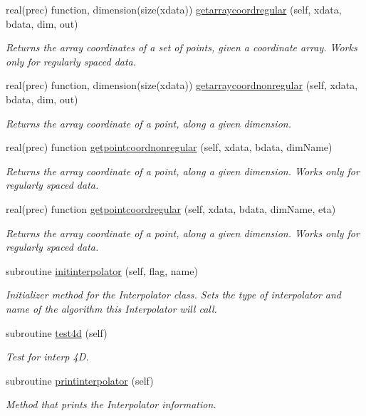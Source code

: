 \begin{DoxyCompactItemize}
real(prec) function, dimension(size(xdata)) \mbox{\hyperlink{namespaceinterpolator__mod_a754f0cf5a885cf5f42a78728bb50c935}{getarraycoordregular}} (self, xdata, bdata, dim, out)
\begin{DoxyCompactList}\small\item\em Returns the array coordinates of a set of points, given a coordinate array. Works only for regularly spaced data. \end{DoxyCompactList}\item 
real(prec) function, dimension(size(xdata)) \mbox{\hyperlink{namespaceinterpolator__mod_a559aea65a39f0e640874f388af7a259d}{getarraycoordnonregular}} (self, xdata, bdata, dim, out)
\begin{DoxyCompactList}\small\item\em Returns the array coordinate of a point, along a given dimension. \end{DoxyCompactList}\item 
real(prec) function \mbox{\hyperlink{namespaceinterpolator__mod_a42030e713960b5bf88d00a76a7ed0a72}{getpointcoordnonregular}} (self, xdata, bdata, dim\+Name)
\begin{DoxyCompactList}\small\item\em Returns the array coordinate of a point, along a given dimension. Works only for regularly spaced data. \end{DoxyCompactList}\item 
real(prec) function \mbox{\hyperlink{namespaceinterpolator__mod_ab47cccb1adf61dcfca1b1ca5a5d213cd}{getpointcoordregular}} (self, xdata, bdata, dim\+Name, eta)
\begin{DoxyCompactList}\small\item\em Returns the array coordinate of a point, along a given dimension. Works only for regularly spaced data. \end{DoxyCompactList}\item 
subroutine \mbox{\hyperlink{namespaceinterpolator__mod_adcaf3bba800f19991ed4f33c968184e9}{initinterpolator}} (self, flag, name)
\begin{DoxyCompactList}\small\item\em Initializer method for the Interpolator class. Sets the type of interpolator and name of the algorithm this Interpolator will call. \end{DoxyCompactList}\item 
subroutine \mbox{\hyperlink{namespaceinterpolator__mod_ac27ad06522b34071302dc09d10b0ec7e}{test4d}} (self)
\begin{DoxyCompactList}\small\item\em Test for interp 4D. \end{DoxyCompactList}\item 
subroutine \mbox{\hyperlink{namespaceinterpolator__mod_a9b149bc8a3da5d1864b8c049f8b00697}{printinterpolator}} (self)
\begin{DoxyCompactList}\small\item\em Method that prints the Interpolator information. \end{DoxyCompactList}\end{DoxyCompactItemize}


